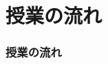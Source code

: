 \documentclass[aspectratio=169,xcolor={dvipsnames,table}]{beamer}
\newcommand{\myaudio}[1]{\href{#1}{\faVolumeUp}}
\begin{document}
\section*{授業の流れ}
\begin{frame}[plain]
  \frametitle{授業の流れ}
  \tableofcontents
\end{frame}

%
%
%
%
\end{document}
